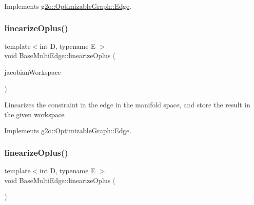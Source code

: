 Implements \mbox{\hyperlink{classg2o_1_1_optimizable_graph_1_1_edge_a56fbf3430ddf591e3c619bdd1b7e4499}{g2o\+::\+Optimizable\+Graph\+::\+Edge}}.

\mbox{\label{classg2o_1_1_base_multi_edge_a72176776797987b8ae79ea2e33971e9e}} 
\subsubsection{\texorpdfstring{linearize\+Oplus()}{linearizeOplus()}\hspace{0.1cm}{\footnotesize\ttfamily [1/2]}}
{\footnotesize\ttfamily template$<$int D, typename E $>$ \\
void Base\+Multi\+Edge\+::linearize\+Oplus (\begin{DoxyParamCaption}\item[{\mbox{\hyperlink{classg2o_1_1_jacobian_workspace}{Jacobian\+Workspace}} \&}]{jacobian\+Workspace }\end{DoxyParamCaption})\hspace{0.3cm}{\ttfamily [virtual]}}

Linearizes the constraint in the edge in the manifold space, and store the result in the given workspace 

Implements \mbox{\hyperlink{classg2o_1_1_optimizable_graph_1_1_edge_a0fdad5ebfb4efec9f893b57f67e0fbe1}{g2o\+::\+Optimizable\+Graph\+::\+Edge}}.

\mbox{\label{classg2o_1_1_base_multi_edge_a6196a4cd1ddc2ef27c1474252bb60e9f}} 
\subsubsection{\texorpdfstring{linearize\+Oplus()}{linearizeOplus()}\hspace{0.1cm}{\footnotesize\ttfamily [2/2]}}
{\footnotesize\ttfamily template$<$int D, typename E $>$ \\
void Base\+Multi\+Edge\+::linearize\+Oplus (\begin{DoxyParamCaption}{ }\end{DoxyParamCaption})\hspace{0.3cm}{\ttfamily [virtual]}}

